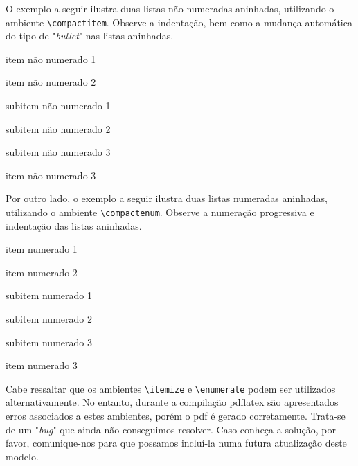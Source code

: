 \begin{apendicesenv}
O exemplo a seguir ilustra duas listas não numeradas aninhadas, utilizando o ambiente \verb|\compactitem|. Observe a indentação, bem como a mudança automática do tipo de "\textit{bullet}"{} nas listas aninhadas.



\begin{compactitem}
    \item item não numerado 1
    \item item não numerado 2
    \begin{compactitem}
        \item subitem não numerado 1
        \item subitem não numerado 2
        \item subitem não numerado 3
    \end{compactitem}
    \item item não numerado 3
\end{compactitem}


Por outro lado, o exemplo a seguir ilustra duas listas numeradas aninhadas, utilizando o ambiente \verb|\compactenum|. Observe a numeração progressiva e indentação das listas aninhadas.


\begin{compactenum}
    \item item numerado 1
    \item item numerado 2
    \begin{compactenum}
        \item subitem numerado 1
        \item subitem numerado 2
        \item subitem numerado 3
    \end{compactenum}
    \item item numerado 3
\end{compactenum}

Cabe ressaltar que os ambientes \verb|\itemize| e \verb|\enumerate| podem ser utilizados alternativamente. No entanto, durante a compilação pdflatex são apresentados erros associados a estes ambientes, porém o pdf é gerado corretamente. Trata-se de um "\textit{bug}"{} que ainda não conseguimos resolver. Caso conheça a solução, por favor, comunique-nos para que possamos incluí-la numa futura atualização deste modelo.




\end{apendicesenv}
